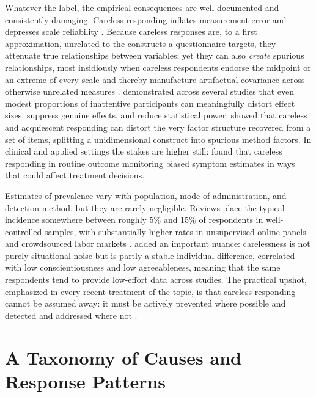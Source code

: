 \documentclass[doc,11pt,donotrepeattitle]{apa7}
\begin{document}
Whatever the label, the empirical consequences are well documented and
consistently damaging. Careless responding inflates measurement error and
depresses scale reliability \parencite{huang2012detecting}. Because careless
responses are, to a first approximation, unrelated to the constructs a
questionnaire targets, they attenuate true relationships between variables; yet
they can also \emph{create} spurious relationships, most insidiously when
careless respondents endorse the midpoint or an extreme of every scale and
thereby manufacture artifactual covariance across otherwise unrelated measures
\parencite{huang2015insufficient}. \textcite{maniaci2014caring} demonstrated
across several studies that even modest proportions of inattentive participants
can meaningfully distort effect sizes, suppress genuine effects, and reduce
statistical power. \textcite{kam2015careless} showed that careless and
acquiescent responding can distort the very factor structure recovered from a
set of items, splitting a unidimensional construct into spurious method
factors. In clinical and applied settings the stakes are higher still:
\textcite{conijn2019assessment} found that careless responding in routine
outcome monitoring biased symptom estimates in ways that could affect treatment
decisions.

Estimates of prevalence vary with population, mode of administration, and
detection method, but they are rarely negligible. Reviews place the typical
incidence somewhere between roughly 5\% and 15\% of respondents in
well-controlled samples, with substantially higher rates in unsupervised online
panels and crowdsourced labor markets \parencite{ward2023dealing,
meade2012identifying, curran2016methods}. \textcite{bowling2016who} added an
important nuance: carelessness is not purely situational noise but is partly a
stable individual difference, correlated with low conscientiousness and low
agreeableness, meaning that the same respondents tend to provide low-effort data
across studies. The practical upshot, emphasized in every recent treatment of
the topic, is that careless responding cannot be assumed away: it must be
actively prevented where possible and detected and addressed where not
\parencite{desimone2015best, desimone2018dirty, ward2023dealing}.

\section{A Taxonomy of Causes and Response Patterns}
\end{document}
